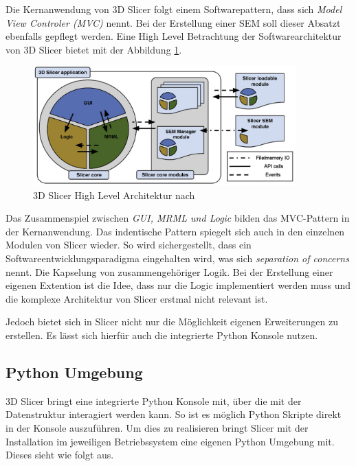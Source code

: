 Die Kernanwendung von 3D Slicer folgt einem Softwarepattern, dass sich \textit{Model
View Controler (MVC)} nennt. Bei der Erstellung einer SEM soll dieser Absatzt
ebenfalls gepflegt werden. Eine High Level Betrachtung der Softwarearchitektur von
3D Slicer bietet \cite[Seite 1332]{fedorov2012slicer} mit der Abbildung \ref{fig:3d_slicer_architektur}.

\begin{figure}[h]
	\centering
	\includegraphics[width=0.9\textwidth]{img/3d_slicer_architektur.jpg}
	\caption{3D Slicer High Level Architektur nach \citet[Seite 1326]{fedorov2012slicer}}
	\label{fig:3d_slicer_architektur}
\end{figure}

Das Zusammenspiel zwischen \textit{GUI, MRML und Logic} bilden das MVC-Pattern in
der Kernanwendung. Das indentische Pattern spiegelt sich auch in den einzelnen
Modulen von Slicer wieder. So wird sichergestellt, dass ein
Softwareentwicklungsparadigma eingehalten wird, was sich \textit{separation of
concerns} nennt. Die Kapselung von zusammengehöriger Logik. Bei der Erstellung
einer eigenen Extention ist die Idee, dass nur die Logic implementiert werden muss
und die komplexe Architektur von Slicer erstmal nicht relevant ist.

Jedoch bietet sich in Slicer nicht nur die Möglichkeit eigenen Erweiterungen zu erstellen.
Es lässt sich hierfür auch die integrierte Python Konsole nutzen.

\subsection{Python Umgebung}
\label{subsec:pythob_umgebung} 3D Slicer bringt eine integrierte Python Konsole
mit, über die mit der Datenstruktur interagiert werden kann. So ist es möglich
Python Skripte direkt in der Konsole auszuführen. Um dies zu realisieren bringt Slicer
mit der Installation im jeweiligen Betriebssystem eine eigenen Python Umgebung mit.
Dieses sieht wie folgt aus.

